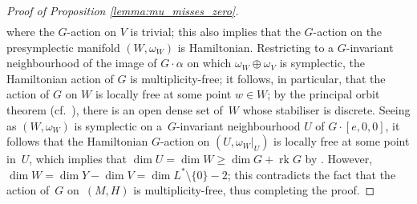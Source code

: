 \documentclass[pdftex]{sigma}
\numberwithin{equation}{section}
\newcommand{\CM}{(M,H)} %
\newcommand{\SYM}{L^* \setminus \{0\}} %
\begin{document}
\begin{proof}[Proof of Proposition \ref{lemma:mu_misses_zero}]
\begin{gather*}
 \end{gather*}
where the $G$-action on $V$ is trivial; this also implies that the $G$-action on the presymplectic manifold $(W,\omega_W)$ is Hamiltonian. Restricting to a $G$-invariant neighbourhood of the image of $G \cdot \alpha$ on which $\omega_W \oplus \omega_V$ is symplectic, the Hamiltonian action of $G$ is multiplicity-free; it follows, in particular, that the action of $G$ on $W$ is locally free at some point $w \in W$; by the principal orbit theorem (cf.\ \cite[Theorem~2.8.5]{duistermaat_kolk}), there is an open dense set of~$W$ whose stabiliser is discrete. Seeing as $(W,\omega_W)$ is symplectic on a~$G$-invariant neighbourhood $U$ of $G\cdot[e,0,0]$, it follows that the Hamiltonian $G$-action on $(U, \omega_W|_U)$ is locally free at some point in~$U$, which implies that $\dim U = \dim W \geq \dim G + \operatorname{rk} G$ by \cite[Theorem~5.1.6]{gui_sja}. However, $\dim W = \dim Y - \dim V = \dim \SYM - 2$; this contradicts the fact that the action of~$G$ on~$\CM$ is multiplicity-free, thus completing the proof.
\end{proof}
\end{document}
